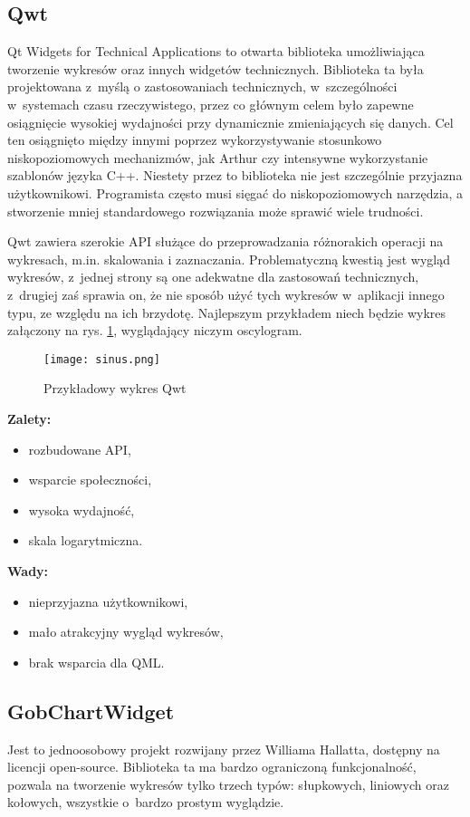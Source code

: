 \subsection{Qwt}
Qt Widgets for Technical Applications to otwarta biblioteka umożliwiająca tworzenie wykresów oraz innych widgetów technicznych. Biblioteka ta była projektowana z~myślą o zastosowaniach technicznych, w~szczególności w~systemach czasu rzeczywistego, przez co głównym celem było zapewne osiągnięcie wysokiej wydajności przy dynamicznie zmieniających się danych. Cel ten osiągnięto między innymi poprzez wykorzystywanie stosunkowo niskopoziomowych mechanizmów, jak Arthur czy intensywne wykorzystanie szablonów języka C++. Niestety przez to biblioteka nie jest szczególnie przyjazna użytkownikowi. Programista często musi sięgać do niskopoziomowych narzędzia, a stworzenie mniej standardowego rozwiązania może sprawić wiele trudności.\newline

Qwt zawiera szerokie API służące do przeprowadzania różnorakich operacji na wykresach, m.in. skalowania i zaznaczania. Problematyczną kwestią jest wygląd wykresów, z~jednej strony są one adekwatne dla zastosowań technicznych, z~drugiej zaś sprawia on, że nie sposób użyć tych wykresów w~aplikacji innego typu, ze względu na ich brzydotę. Najlepszym przykładem niech będzie wykres załączony na rys. \ref{rys:wykres:sinus}, wyglądający niczym oscylogram.
\begin{figure}
\centering
\caption{Przykładowy wykres Qwt}\label{rys:wykres:sinus}
\texttt{[image: sinus.png]}
\end{figure}

\textbf{Zalety:}
\begin{itemize}
\item{rozbudowane API,}
\item{wsparcie społeczności,}
\item{wysoka wydajność,}
\item{skala logarytmiczna.}\newline
\end{itemize}

\textbf{Wady:}
\begin{itemize}
\item{nieprzyjazna użytkownikowi,}
\item{mało atrakcyjny wygląd wykresów,}
\item{brak wsparcia dla QML.}
\end{itemize}

\subsection{GobChartWidget}
Jest to jednoosobowy projekt rozwijany przez Williama Hallatta, dostępny na licencji open-source. Biblioteka ta ma bardzo ograniczoną funkcjonalność, pozwala na tworzenie wykresów tylko trzech typów: słupkowych, liniowych oraz kołowych, wszystkie o~bardzo prostym wyglądzie.\newline

